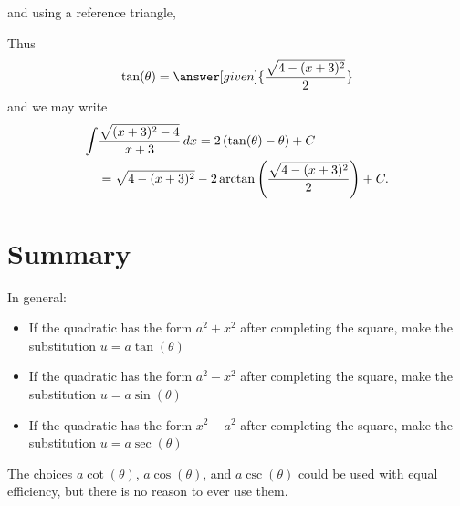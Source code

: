 \documentclass{ximera}
\begin{document}
\begin{example}
\begin{explanation}
\[    \]
    and using a reference triangle,
    \begin{image}
    \end{image}
    Thus
    \[
    \tan(\theta) = \answer[given]{\frac{\sqrt{4-(x+3)^2}}{2}}
    \]
    and we may write
    \begin{align*}
    \int &\frac{\sqrt{(x+3)^2-4}}{x+3} \mathop{}\!d x = 2\left(\tan(\theta) - \theta\right) + C\\
      &= \sqrt{4-(x+3)^2} - 2\arctan\left(\frac{\sqrt{4-(x+3)^2}}{2}\right) + C.
    \end{align*}
  \end{explanation}
\end{example}


\section{Summary}

In general:
\begin{itemize}
\item If the quadratic has the form $a^2 + x^2$ after completing the square, make the substitution $u = a\tan(\theta)$
\item If the quadratic has the form $a^2 - x^2$ after completing the square, make the substitution $u = a\sin(\theta)$ 
\item If the quadratic has the form $x^2 - a^2$ after completing the
  square, make the substitution $u = a\sec(\theta)$
\end{itemize}
The choices $a\cot(\theta)$, $a\cos(\theta)$, and $a \csc(\theta)$
could be used with equal efficiency, but there is no reason to ever
use them.
\end{document}
